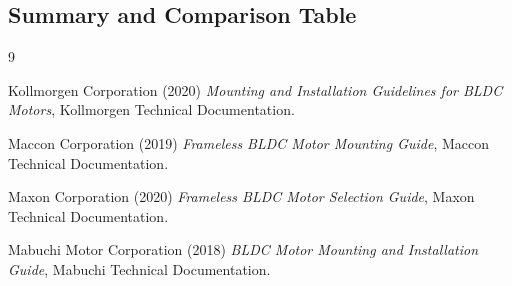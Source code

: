 \documentclass[internal]{../../classes/nervtech-research}
\begin{document}
\subsection{Summary and Comparison Table}


\clearpage

\begin{thebibliography}{9}

Kollmorgen Corporation (2020) \emph{Mounting and Installation Guidelines for BLDC Motors}, Kollmorgen Technical Documentation.

Maccon Corporation (2019) \emph{Frameless BLDC Motor Mounting Guide}, Maccon Technical Documentation.

Maxon Corporation (2020) \emph{Frameless BLDC Motor Selection Guide}, Maxon Technical Documentation.

Mabuchi Motor Corporation (2018) \emph{BLDC Motor Mounting and Installation Guide}, Mabuchi Technical Documentation.

\end{thebibliography}
\end{document}
